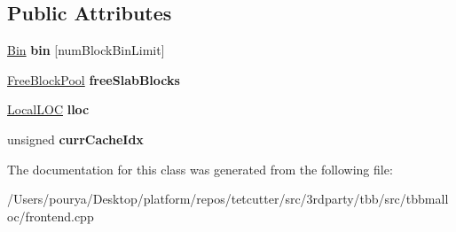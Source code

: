 \subsection*{Public Attributes}
\begin{DoxyCompactItemize}
\item 
\hypertarget{classrml_1_1internal_1_1TLSData_a140deb931bef016f17cacae4ec0754c3}{}\hyperlink{classrml_1_1internal_1_1Bin}{Bin} {\bfseries bin} \mbox{[}num\+Block\+Bin\+Limit\mbox{]}\label{classrml_1_1internal_1_1TLSData_a140deb931bef016f17cacae4ec0754c3}

\item 
\hypertarget{classrml_1_1internal_1_1TLSData_a00be57391bf8297f48bab787f963f666}{}\hyperlink{classrml_1_1internal_1_1FreeBlockPool}{Free\+Block\+Pool} {\bfseries free\+Slab\+Blocks}\label{classrml_1_1internal_1_1TLSData_a00be57391bf8297f48bab787f963f666}

\item 
\hypertarget{classrml_1_1internal_1_1TLSData_a9cc38b7f838e548d0fbac8d3a194b2cf}{}\hyperlink{classrml_1_1internal_1_1LocalLOCImpl}{Local\+L\+O\+C} {\bfseries lloc}\label{classrml_1_1internal_1_1TLSData_a9cc38b7f838e548d0fbac8d3a194b2cf}

\item 
\hypertarget{classrml_1_1internal_1_1TLSData_a0afea8877687495caf569889c796d535}{}unsigned {\bfseries curr\+Cache\+Idx}\label{classrml_1_1internal_1_1TLSData_a0afea8877687495caf569889c796d535}

\end{DoxyCompactItemize}


The documentation for this class was generated from the following file\+:\begin{DoxyCompactItemize}
\item 
/\+Users/pourya/\+Desktop/platform/repos/tetcutter/src/3rdparty/tbb/src/tbbmalloc/frontend.\+cpp\end{DoxyCompactItemize}
